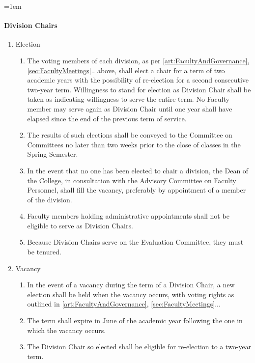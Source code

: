 \documentclass{manual}
\let\oldparagraph\paragraph
\renewcommand\paragraph{\leftskip=1em\oldparagraph}
\newcommand{\itemLevelA}{\alph*.}
\newcommand{\itemLevelB}{\arabic*)}
\newcommand{\itemRefA}{\alph*}
\newcommand{\itemRefB}{\arabic*}
\begin{document}
\paragraph{Division Chairs}\label{par:DivisionChairs}
\begin{enumerate}[label=\itemLevelA,ref=\itemRefA]
\item Election
\begin{enumerate}[label=\itemLevelB,ref=\itemRefB]
\item The voting members of each division, as per \cref{art:FacultyAndGovernance}, \cref{sec:FacultyMeetings}.. above, shall elect a chair for a term of two academic years with the possibility of re-election for a second consecutive two-year term. Willingness to stand for election as Division Chair shall be taken as indicating willingness to serve the entire term. No Faculty member may serve again as Division Chair until one year shall have elapsed since the end of the previous term of service.
\item The results of such elections shall be conveyed to the Committee on Committees no later than two weeks prior to the close of classes in the Spring Semester.
\item In the event that no one has been elected to chair a division, the Dean of the College, in consultation with the Advisory Committee on Faculty Personnel, shall fill the vacancy, preferably by appointment of a member of the division.
\item Faculty members holding administrative appointments shall not be eligible to serve as Division Chairs.
\item  Because Division Chairs serve on the Evaluation Committee, they must be tenured.
\end{enumerate}

\item Vacancy
\begin{enumerate}[label=\itemLevelB,ref=\itemRefB]
\item In the event of a vacancy during the term of a Division Chair, a new election shall be held when the vacancy occurs, with voting rights as outlined in \cref{art:FacultyAndGovernance}, \cref{sec:FacultyMeetings}...
\item The term shall expire in June of the academic year following the one in which the vacancy occurs.
\item The Division Chair so elected shall be eligible for re-election to a two-year term. 
\end{enumerate}


\end{enumerate}
\end{document}
